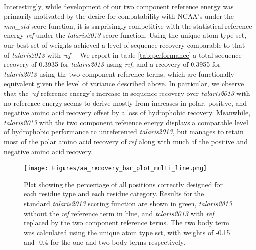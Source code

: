 \paragraph{}
Interestingly, while development of our two component reference energy was primarily motivated by the desire for compatability with NCAA's under the \textit{mm\_std} score function, it is surprisingly competitive with the statistical reference energy \textit{ref} under the \textit{talaris2013} score function.
Using the unique atom type set, our best set of weights achieved a level of sequence recovery comparable to that of \textit{talaris2013} with \textit{ref}---
We report in table \ref{tab:performance} a total sequence recovery of 0.3935 for \textit{talaris2013} using \textit{ref}, and a recovery of 0.3955 for \textit{talaris2013} using the two component reference terms, which are functionally equivalent given the level of variance described above.
In particular, we observe that the \textit{ref} reference energy's increase in sequence recovery over \textit{talaris2013} with no reference energy seems to derive mostly from increases in polar, positive, and negative amino acid recovery offset by a loss of hydrophobic recovery.
Meanwhile, \textit{talaris2013} with the two component reference energy displays a comparable level of hydrophobic performance to unreferenced \textit{talaris2013}, but manages to retain most of the polar amino acid recovery of \textit{ref} along with much of the positive and negative amino acid recovery.

\begin{figure}[hbtp]
  \texttt{[image: Figures/aa\_recovery\_bar\_plot\_multi\_line.png]}
  \caption{Plot showing the percentage of all positions correctly designed for each residue type and each residue category.
Results for the standard \textit{talaris2013} scoring function are shown in green, \textit{talaris2013} without the \textit{ref} reference term in blue, and \textit{talaris2013} with \textit{ref} replaced by the two component reference terms.
The two body term was calculated using the unique atom type set, with weights of -0.15 and -0.4 for the one and two body terms respectively.}
  \label{fig:aa_recovery}
\end{figure}

